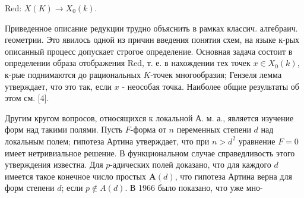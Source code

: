 \documentclass[10pt]{article}
\begin{document}
Red: $X(K) \longrightarrow X_{0}(k)$.



Приведенное описание редукции трудно объяснить в рамках классич. алгебраич. геометрии. Это явилось одной из причин введения понятия схем, на языке к-рых описанный процесс допускает строгое определение. Основная задача состоит в определении образа отображения Red, т. е. в нахождении тех точек $x \in X_{0}(k)$, к-рые поднимаются до рациональных $K$-точек многообразия; Гензеля лемма утверждает, что это так, если $x$ - неособая точка. Наиболее общие результаты об этом см. [4].



Другим кругом вопросов, относящихся к локальной А. м. а., является изучение форм над такими полями. Пусть $F$-форма от $n$ переменных степени $d$ над локальным полем; гипотеза Артина утверждает, что при $n>d^{2}$ уравнение $F=0$ имеет нетривиальное решение. В функциональном случае справедливость этого утверждения известна. Для $p$-адических полей доказано, что для каждого $d$ имеется такое конечное число простых $\boldsymbol{A}(d)$, что гипотеза Артина верна для форм степени $d$; если $p \notin A(d)$. В 1966 было показано, что уже мно-
\end{document}
